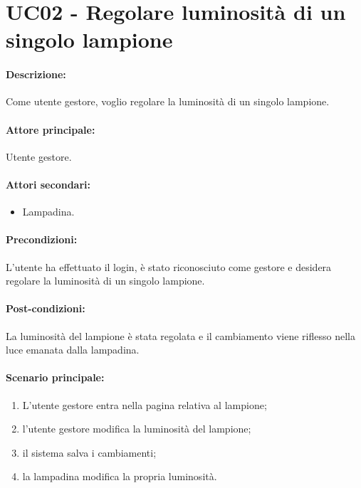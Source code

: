 \section{UC02 - Regolare luminosità di un singolo lampione}

\paragraph{Descrizione:}
Come utente gestore, voglio regolare la luminosità di un singolo lampione.

\paragraph{Attore principale:}
Utente gestore.

\paragraph{Attori secondari:}
\begin{itemize}
    \item Lampadina.
\end{itemize}

\paragraph{Precondizioni:}
L'utente ha effettuato il login, è stato riconosciuto come gestore e desidera regolare la luminosità di un singolo lampione.

\paragraph{Post-condizioni:}
La luminosità del lampione è stata regolata e il cambiamento viene riflesso nella luce emanata dalla lampadina.

\paragraph{Scenario principale:}
\begin{enumerate}
    \item L'utente gestore entra nella pagina relativa al lampione;
    \item l'utente gestore modifica la luminosità del lampione;
    \item il sistema salva i cambiamenti;
    \item la lampadina modifica la propria luminosità.
\end{enumerate}

